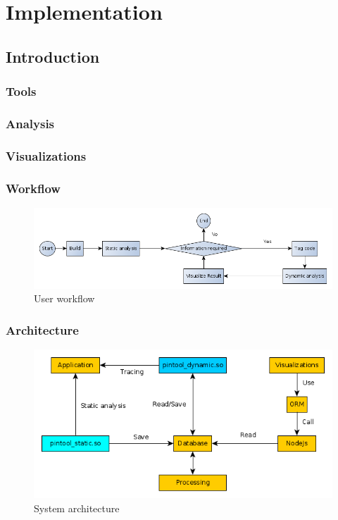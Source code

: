 \chapter{Implementation}

\section{Introduction}

\subsection{Tools}
\subsection{Analysis}
\subsection{Visualizations}
\subsection{Workflow}

\begin{figure}
	\centering
	\includegraphics[width=1\textwidth]{workflow}
	\caption{User workflow}
	\label{workflow}
\end{figure}

\subsection{Architecture}

\begin{figure}
	\centering
	\includegraphics[width=1\textwidth]{architecture}
	\caption{System architecture}
	\label{architecture}
\end{figure}

